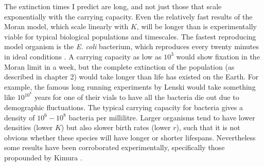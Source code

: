 The extinction times I predict are long, and not just those that scale exponentially with the carrying capacity. %
Even the relatively fast results of the Moran model, which scale linearly with $K$, will be longer than is experimentally viable for typical biological populations and timescales. 
The fastest reproducing model organism is the \emph{E. coli} bacterium, which reproduces every twenty minutes in ideal conditions \cite{Lenski1991,Brock2006}. 
A carrying capacity as low as $10^3$ would show fixation in the Moran limit in a week, but the complete extinction of the population (as described in chapter 2) would take longer than life has existed on the Earth. 
For example, the famous long running experiments by Lenski \cite{Lenski1991} would take something like $10^{10^8}$ years for one of their vials to have all the bacteria die out due to demographic fluctuations. 
The typical carrying capacity for bacteria gives a density of $10^6 - 10^8$ bacteria per millilitre. 
Larger organisms tend to have lower densities (lower $K$) but also slower birth rates (lower $r$), such that it is not obvious whether these species will have longer or shorter lifespans. 
Nevertheless some results have been corroborated experimentally, specifically those propounded by Kimura \cite{Kimura1980,Kimura1983}. 

